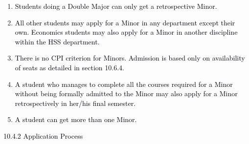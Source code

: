 \documentclass[12pt]{article}
\begin{document}
\vspace{\baselineskip}
\begin{enumerate}
	\item {\fontsize{10pt}{12.0pt}\selectfont \textcolor[HTML]{00000A}{Students doing a Double Major can only get a retrospective Minor.}\par}\par


\vspace{\baselineskip}
	\item {\fontsize{10pt}{12.0pt}\selectfont \textcolor[HTML]{00000A}{All other students may apply for a Minor in any department except their own. Economics students may also apply for a Minor in another discipline within the HSS department.}\par}\par


\vspace{\baselineskip}
	\item {\fontsize{9pt}{10.8pt}\selectfont \textcolor[HTML]{00000A}{There is no CPI criterion for Minors. Admission is based only on availability of seats as detailed in section 10.6.4.}\par}\par


\vspace{\baselineskip}
	\item {\fontsize{10pt}{12.0pt}\selectfont \textcolor[HTML]{00000A}{A student who manages to complete all the courses required for a Minor without being formally admitted to the Minor may also apply for a Minor retrospectively in her/his final semester.}\par}\par


\vspace{\baselineskip}
	\item {\fontsize{10pt}{12.0pt}\selectfont \textcolor[HTML]{00000A}{A student can get more than one Minor.}\par}
\end{enumerate}\par


\vspace{\baselineskip}
{\fontsize{10pt}{12.0pt}\selectfont \textcolor[HTML]{00000A}{10.4.2 Application Process}\par}\par
\end{document}
